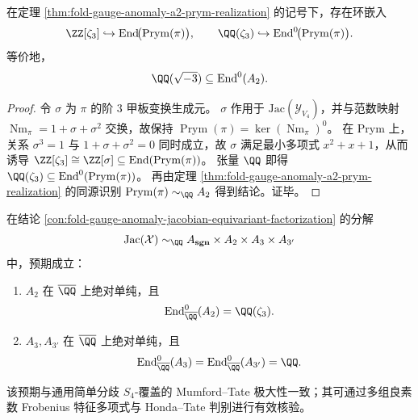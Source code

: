 \begin{theorem}\label{thm:fold-gauge-anomaly-a2-eisenstein-multiplication}
在定理 \ref{thm:fold-gauge-anomaly-a2-prym-realization} 的记号下，存在环嵌入
\[
\ZZ[\zeta_3]\hookrightarrow \operatorname{End}\!\bigl(\operatorname{Prym}(\pi)\bigr),
\qquad
\QQ(\zeta_3)\hookrightarrow \operatorname{End}^0\!\bigl(\operatorname{Prym}(\pi)\bigr).
\]
等价地，
\[
\QQ(\sqrt{-3})\subseteq \operatorname{End}^0(A_2).
\]
\end{theorem}
\begin{proof}
令 \(\sigma\) 为 \(\pi\) 的阶 \(3\) 甲板变换生成元。
\(\sigma\) 作用于 \(\mathrm{Jac}(\mathcal Y_{V_4})\)，并与范数映射 \(\operatorname{Nm}_{\pi}=1+\sigma+\sigma^2\) 交换，故保持
\(\operatorname{Prym}(\pi)=\ker(\operatorname{Nm}_{\pi})^0\)。
在 Prym 上，关系 \(\sigma^3=1\) 与 \(1+\sigma+\sigma^2=0\) 同时成立，故
\(\sigma\) 满足最小多项式 \(x^2+x+1\)，从而诱导
\(
\ZZ[\zeta_3]\cong \ZZ[\sigma]\subseteq \operatorname{End}(\operatorname{Prym}(\pi))
\)。
张量 \(\QQ\) 即得 \(\QQ(\zeta_3)\subseteq \operatorname{End}^0(\operatorname{Prym}(\pi))\)。
再由定理 \ref{thm:fold-gauge-anomaly-a2-prym-realization} 的同源识别
\(\operatorname{Prym}(\pi)\sim_{\QQ}A_2\) 得到结论。证毕。
\end{proof}

\begin{conjecture}[等型因子的绝对单纯与内自同态环极小化]\label{conj:fold-gauge-anomaly-isotypic-absolute-simplicity}
在结论 \ref{con:fold-gauge-anomaly-jacobian-equivariant-factorization} 的分解
\[
\mathrm{Jac}(\mathcal X)\sim_{\QQ}A_{\mathbf{sgn}}\times A_2\times A_3\times A_{3'}
\]
中，预期成立：
\begin{enumerate}
  \item \(A_2\) 在 \(\overline{\QQ}\) 上绝对单纯，且
  \[
  \operatorname{End}^0_{\overline{\QQ}}(A_2)=\QQ(\zeta_3).
  \]
  \item \(A_3,A_{3'}\) 在 \(\overline{\QQ}\) 上绝对单纯，且
  \[
  \operatorname{End}^0_{\overline{\QQ}}(A_3)=\operatorname{End}^0_{\overline{\QQ}}(A_{3'})=\QQ.
  \]
\end{enumerate}
该预期与通用简单分歧 \(S_4\)-覆盖的 Mumford--Tate 极大性一致；其可通过多组良素数 Frobenius 特征多项式与 Honda--Tate 判别进行有效核验。
\end{conjecture}

\endinput

